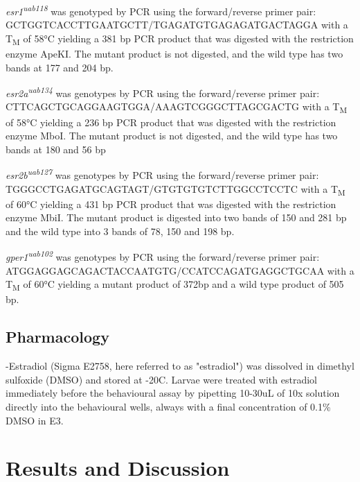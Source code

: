 \documentclass[9pt,lineno]{RandlettLab_elife}
\begin{document}
\emph{esr1\textsuperscript{uab118}} was genotyped by PCR using the forward/reverse primer pair:
\\ \mbox{GCTGGTCACCTTGAATGCTT/TGAGATGTGAGAGATGACTAGGA} with a T\textsubscript{M} of 58°C yielding a 381 bp PCR product that was digested with the restriction enzyme ApeKI. 
The mutant product is not digested, and the wild type has two bands at 177 and 204 bp.

\emph{esr2a\textsuperscript{uab134}} was genotypes by PCR using the forward/reverse primer pair:
\\ \mbox{CTTCAGCTGCAGGAAGTGGA/AAAGTCGGGCTTAGCGACTG} with a T\textsubscript{M} of 58°C yielding a 236 bp PCR product that was digested with the restriction enzyme MboI.
The mutant product is not digested, and the wild type has two bands at 180 and 56 bp 

\emph{esr2b\textsuperscript{uab127}} was genotypes by PCR using the forward/reverse primer pair:
\\ \mbox{TGGGCCTGAGATGCAGTAGT/GTGTGTGTCTTGGCCTCCTC} with a T\textsubscript{M} of 60°C yielding a 431 bp PCR product that was digested with the restriction enzyme MbiI.
The mutant product is digested into two bands of 150 and 281 bp and the wild type into 3 bands of 78, 150 and 198 bp. 

\emph{gper1\textsuperscript{uab102}} was genotypes by PCR using the forward/reverse primer pair:
\\ \mbox{ATGGAGGAGCAGACTACCAATGTG/CCATCCAGATGAGGCTGCAA} with a T\textsubscript{M} of 60°C yielding a mutant product of 372bp and a wild type product of 505 bp.


\subsection{Pharmacology}

\textbeta-Estradiol (Sigma E2758, here referred to as "estradiol") was dissolved in dimethyl sulfoxide (DMSO) and stored at -20\degree C. 
Larvae were treated with estradiol immediately before the behavioural assay by pipetting 10-30uL of 10x solution directly into the behavioural wells, always with a final concentration of 0.1\% DMSO in E3.

\section{Results and Discussion}
\end{document}
